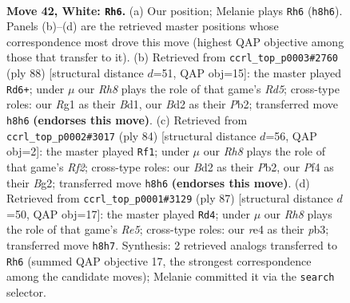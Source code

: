 \documentclass[11pt]{article}
\begin{document}
\clearpage

\begin{figure}[p]\centering
\begin{subfigure}{0.46\textwidth}\centering
\resizebox{\linewidth}{!}{%
\newchessgame
\chessboard[
  setfen={4n2R/p1p5/2Pk1p2/8/4rP1p/1r6/3B3P/3K1BR1 w - - 2 42},
  showmover=false,
  pgfstyle=straightmove, color=movearrow, markmove={h8-h6}
]}
\caption{}
\end{subfigure}\hfill
\begin{subfigure}{0.46\textwidth}\centering
\resizebox{\linewidth}{!}{%
\newchessgame
\chessboard[
  setfen={8/1p3p2/1k3p2/3Rn1pp/1Pr5/6PP/1P3P2/1K1B4 w - - 0 45},
  showmover=false,
  pgfstyle=straightmove, color=movearrow, markmove={d5-d6}
]}
\caption{}
\end{subfigure}
\\[4pt]
\begin{subfigure}{0.46\textwidth}\centering
\resizebox{\linewidth}{!}{%
\newchessgame
\chessboard[
  setfen={1r6/3Rnpk1/p6p/5p2/1P6/6PP/1P3RB1/2r3K1 w - - 2 43},
  showmover=false,
  pgfstyle=straightmove, color=movearrow, markmove={f2-f1}
]}
\caption{}
\end{subfigure}\hfill
\begin{subfigure}{0.46\textwidth}\centering
\resizebox{\linewidth}{!}{%
\newchessgame
\chessboard[
  setfen={8/8/p3bk2/2R5/P3r1p1/1P2Np2/2P2K1P/8 b - - 9 44},
  showmover=false,
  pgfstyle=straightmove, color=movearrow, markmove={e4-d4}
]}
\caption{}
\end{subfigure}
\caption{\textbf{Move 42, White: \texttt{Rh6}.} (a) Our position; Melanie plays \texttt{Rh6} (\texttt{h8h6}). Panels (b)--(d) are the retrieved master positions whose correspondence most drove this move (highest QAP objective among those that transfer to it). (b) Retrieved from \texttt{ccrl\_top\_p0003\#2760} (ply 88) [structural distance $d$=51, QAP obj=15]: the master played \texttt{Rd6+}; under $\mu$ our \emph{Rh8} plays the role of that game's \emph{Rd5}; cross-type roles: our \emph{R}g1 as their \emph{B}d1, our \emph{B}d2 as their \emph{P}b2; transferred move \texttt{h8h6} \textbf{(endorses this move)}. (c) Retrieved from \texttt{ccrl\_top\_p0002\#3017} (ply 84) [structural distance $d$=56, QAP obj=2]: the master played \texttt{Rf1}; under $\mu$ our \emph{Rh8} plays the role of that game's \emph{Rf2}; cross-type roles: our \emph{B}d2 as their \emph{P}b2, our \emph{P}f4 as their \emph{B}g2; transferred move \texttt{h8h6} \textbf{(endorses this move)}. (d) Retrieved from \texttt{ccrl\_top\_p0001\#3129} (ply 87) [structural distance $d$=50, QAP obj=17]: the master played \texttt{Rd4}; under $\mu$ our \emph{Rh8} plays the role of that game's \emph{Re5}; cross-type roles: our \emph{r}e4 as their \emph{p}b3; transferred move \texttt{h8h7}. Synthesis: 2 retrieved analogs transferred to \texttt{Rh6} (summed QAP objective 17, the strongest correspondence among the candidate moves); Melanie committed it via the \texttt{search} selector.}
\label{fig:thought-m82}
\end{figure}
\end{document}
